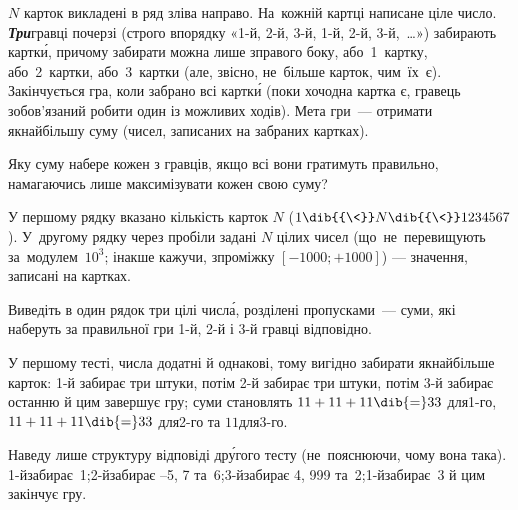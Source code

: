 
$N$ карток викладені в ряд зліва направо. На~кожній картці написане ціле число. \textbf{\emph{Три}}\nolinebreak[3] гравці по\nolinebreak[3] черзі (строго в\nolinebreak[3] порядку 
«\mbox{1-й},
\mbox{2-й},
\mbox{3-й},
\mbox{1-й},
\mbox{2-й},
\mbox{3-й},~…») забирають картк\'{и}, причому забирати можна лише з\nolinebreak[3] правого боку, або~1~картку, або~2~картки, або~3~картки (але, звісно, не~більше карток, чим~їх~є). Закінчується гра, коли забрано всі картк\'{и} (поки хоч\nolinebreak[3] одна картка є, гравець зобов'язаний робити один із можливих ходів). 
Мета гри~--- отримати 
якнайбільшу 
суму (чисел, записаних на забраних картках).

Яку суму набере кожен з гравців, якщо всі вони гратимуть правильно, намагаючись лише максимізувати кожен свою суму?

\InputFile
У першому рядку вказано кількість карток $N$ ($1\dib{{\<}}N\dib{{\<}}1234567$). У~другому рядку через пробіли задані $N$ цілих чисел (що~не~перевищують за~модулем~$10^3$; інакше кажучи, з\nolinebreak[2] проміжку $[-1000; +1000]$) --- значення, записані на картках.


\OutputFile
Виведіть в один рядок три цілі \mbox{числ\'{а}}, розділені пропусками~--- суми, які наберуть за правильної гри \mbox{1-й}, \mbox{2-й} і \mbox{3-й} гравці відповідно.


\Examples

\noindent
\begin{exampleSimple}{13em}{5em}
%
%
%
\end{exampleSimple}

\Notes
У першому 
тесті, %
числа додатні й %
однакові, тому %
вигідно забирати якнайбільше %
карток: \mbox{1-й} забирає три штуки, потім \mbox{2-й} забирає три штуки, потім \mbox{3-й} забирає останню й цим завершує гру; суми становлять 
${11+11+11}\dib{{=}}33$ для\nolinebreak[3] \mbox{1-го},
${11+11+11}\dib{{=}}33$ для\nolinebreak[3] \mbox{2-го} та
$11$\nolinebreak[3] для\nolinebreak[3] \mbox{3-го}. %


Наведу
лише структуру відповіді др\'{у}\-гого 
тесту
(не~пояснюючи, чому вона така).
\mbox{1-й}\nolinebreak[3] забирає~1;\linebreak[3]
\mbox{2-й}\nolinebreak[3] забирає \mbox{–5}, 7 та~6;\linebreak[3]
\mbox{3-й}\nolinebreak[3] забирає 4, 999 та~2;\linebreak[3]
\mbox{1-й}\nolinebreak[3] забирає~3 й цим закінчує гру.


